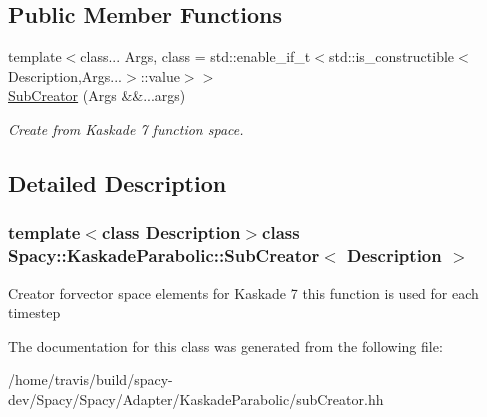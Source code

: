 \subsection*{Public Member Functions}
\begin{DoxyCompactItemize}
\item 
{\footnotesize template$<$class... Args, class  = std\-::enable\-\_\-if\-\_\-t$<$std\-::is\-\_\-constructible$<$\-Description,\-Args...$>$\-::value$>$$>$ }\\\hyperlink{group__VectorSpaceGroup_ga7071ba5e2db9acaf6a4de415cb50ae1e}{Sub\-Creator} (Args \&\&...args)
\begin{DoxyCompactList}\small\item\em Create from Kaskade 7 function space. \end{DoxyCompactList}\end{DoxyCompactItemize}


\subsection{Detailed Description}
\subsubsection*{template$<$class Description$>$class Spacy\-::\-Kaskade\-Parabolic\-::\-Sub\-Creator$<$ Description $>$}

Creator forvector space elements for Kaskade 7 this function is used for each timestep 

The documentation for this class was generated from the following file\-:\begin{DoxyCompactItemize}
\item 
/home/travis/build/spacy-\/dev/\-Spacy/\-Spacy/\-Adapter/\-Kaskade\-Parabolic/sub\-Creator.\-hh\end{DoxyCompactItemize}
